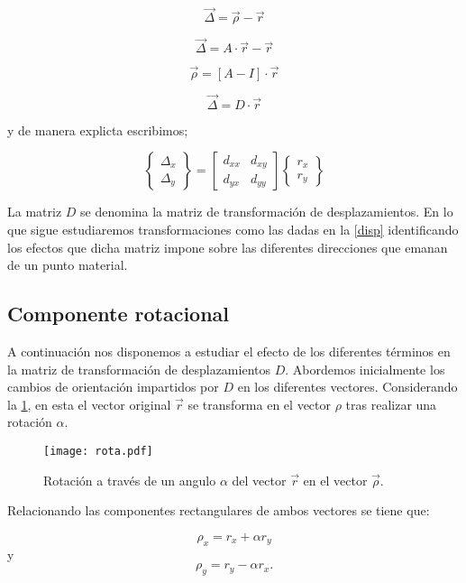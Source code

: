 \documentclass[../notas medios.tex]{subfiles}
\begin{document}
\[\vec \Delta  = \vec \rho  - \vec r\]

\[\vec \Delta  = A \cdot \vec r - \vec r\]

\[\vec \rho  = \left[ {A - I} \right] \cdot \vec r\]

\[\vec \Delta  = D \cdot \vec r\]

y de manera explicta escribimos;

\begin{equation}
\left\{ {\begin{array}{*{20}{c}}
{{\Delta _x}}\\
{{\Delta _y}}
\end{array}} \right\} = \left[ {\begin{array}{*{20}{c}}
{{d_{xx}}}&{{d_{xy}}}\\
{{d_{yx}}}&{{d_{yy}}}
\end{array}} \right]\left\{ {\begin{array}{*{20}{c}}
{{r_x}}\\
{{r_y}}
\end{array}} \right\}
\label{disp}
\end{equation}

La matriz $D$ se denomina la matriz de transformación de desplazamientos. En lo que sigue estudiaremos transformaciones como las dadas en la \cref{disp} identificando los efectos que dicha matriz impone sobre las diferentes direcciones que emanan de un punto material. 

\subsection{Componente rotacional}
A continuación nos disponemos a estudiar el efecto de los diferentes términos en la matriz de transformación de desplazamientos $D$. Abordemos inicialmente los cambios de orientación impartidos por $D$ en los diferentes vectores. Considerando la \cref{rota}, en esta el vector original $\vec{r}$ se transforma en el vector $\rho$ tras realizar una rotación $\alpha$. 

\begin{figure}[H]
\centering
	\texttt{[image: rota.pdf]}
	\caption{Rotación a través de un angulo $\alpha$ del vector $\vec{r}$ en el vector $\vec{\rho}$.}
	\label{rota}
\end{figure}


Relacionando las componentes rectangulares de ambos vectores se tiene que:

\[{\rho _x} = {r_x} + \alpha {r_y}\]
y
\[{\rho _y} = {r_y} - \alpha {r_x}.\]
\end{document}
